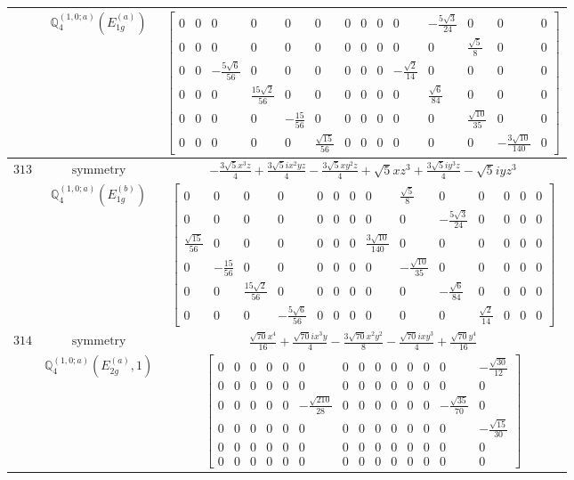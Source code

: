\documentclass[fleqn,8pt,landscape]{jsarticle}
\begin{document}
\begin{longtable}{ccc}
$  $ & $ \mathbb{Q}_{4}^{(1,0;a)}(E_{1g}^{(a)}) $ & $ \begin{bmatrix} 0 & 0 & 0 & 0 & 0 & 0 & 0 & 0 & 0 & 0 & - \frac{5 \sqrt{3}}{24} & 0 & 0 & 0 \\ 0 & 0 & 0 & 0 & 0 & 0 & 0 & 0 & 0 & 0 & 0 & \frac{\sqrt{5}}{8} & 0 & 0 \\ 0 & 0 & - \frac{5 \sqrt{6}}{56} & 0 & 0 & 0 & 0 & 0 & 0 & - \frac{\sqrt{2}}{14} & 0 & 0 & 0 & 0 \\ 0 & 0 & 0 & \frac{15 \sqrt{2}}{56} & 0 & 0 & 0 & 0 & 0 & 0 & \frac{\sqrt{6}}{84} & 0 & 0 & 0 \\ 0 & 0 & 0 & 0 & - \frac{15}{56} & 0 & 0 & 0 & 0 & 0 & 0 & \frac{\sqrt{10}}{35} & 0 & 0 \\ 0 & 0 & 0 & 0 & 0 & \frac{\sqrt{15}}{56} & 0 & 0 & 0 & 0 & 0 & 0 & - \frac{3 \sqrt{10}}{140} & 0 \end{bmatrix} $ \\ \hline
$ 313 $ & $ \text{symmetry} $ & $ - \frac{3 \sqrt{5} x^{3} z}{4} + \frac{3 \sqrt{5} i x^{2} y z}{4} - \frac{3 \sqrt{5} x y^{2} z}{4} + \sqrt{5} x z^{3} + \frac{3 \sqrt{5} i y^{3} z}{4} - \sqrt{5} i y z^{3} $ \\
$  $ & $ \mathbb{Q}_{4}^{(1,0;a)}(E_{1g}^{(b)}) $ & $ \begin{bmatrix} 0 & 0 & 0 & 0 & 0 & 0 & 0 & 0 & \frac{\sqrt{5}}{8} & 0 & 0 & 0 & 0 & 0 \\ 0 & 0 & 0 & 0 & 0 & 0 & 0 & 0 & 0 & - \frac{5 \sqrt{3}}{24} & 0 & 0 & 0 & 0 \\ \frac{\sqrt{15}}{56} & 0 & 0 & 0 & 0 & 0 & 0 & \frac{3 \sqrt{10}}{140} & 0 & 0 & 0 & 0 & 0 & 0 \\ 0 & - \frac{15}{56} & 0 & 0 & 0 & 0 & 0 & 0 & - \frac{\sqrt{10}}{35} & 0 & 0 & 0 & 0 & 0 \\ 0 & 0 & \frac{15 \sqrt{2}}{56} & 0 & 0 & 0 & 0 & 0 & 0 & - \frac{\sqrt{6}}{84} & 0 & 0 & 0 & 0 \\ 0 & 0 & 0 & - \frac{5 \sqrt{6}}{56} & 0 & 0 & 0 & 0 & 0 & 0 & \frac{\sqrt{2}}{14} & 0 & 0 & 0 \end{bmatrix} $ \\ \hline
$ 314 $ & $ \text{symmetry} $ & $ \frac{\sqrt{70} x^{4}}{16} + \frac{\sqrt{70} i x^{3} y}{4} - \frac{3 \sqrt{70} x^{2} y^{2}}{8} - \frac{\sqrt{70} i x y^{3}}{4} + \frac{\sqrt{70} y^{4}}{16} $ \\
$  $ & $ \mathbb{Q}_{4}^{(1,0;a)}(E_{2g}^{(a)},1) $ & $ \begin{bmatrix} 0 & 0 & 0 & 0 & 0 & 0 & 0 & 0 & 0 & 0 & 0 & 0 & 0 & - \frac{\sqrt{30}}{12} \\ 0 & 0 & 0 & 0 & 0 & 0 & 0 & 0 & 0 & 0 & 0 & 0 & 0 & 0 \\ 0 & 0 & 0 & 0 & 0 & - \frac{\sqrt{210}}{28} & 0 & 0 & 0 & 0 & 0 & 0 & - \frac{\sqrt{35}}{70} & 0 \\ 0 & 0 & 0 & 0 & 0 & 0 & 0 & 0 & 0 & 0 & 0 & 0 & 0 & - \frac{\sqrt{15}}{30} \\ 0 & 0 & 0 & 0 & 0 & 0 & 0 & 0 & 0 & 0 & 0 & 0 & 0 & 0 \\ 0 & 0 & 0 & 0 & 0 & 0 & 0 & 0 & 0 & 0 & 0 & 0 & 0 & 0 \end{bmatrix} $ \\ \hline

\end{longtable}
\end{document}
